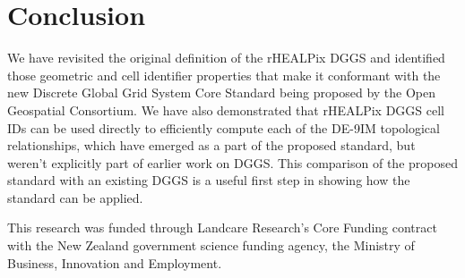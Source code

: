 \documentclass[12pt]{iopart}
\begin{document}
\section{Conclusion}
We have revisited the original definition of the rHEALPix DGGS and identified those geometric and cell identifier properties that make it conformant with the  new Discrete Global Grid System Core Standard being proposed by the Open Geospatial Consortium. We have also demonstrated that rHEALPix DGGS cell IDs can be used directly to efficiently compute each of the DE-9IM topological relationships, which have emerged as a part of the proposed standard, but weren't explicitly part of earlier work on DGGS. This comparison of the proposed standard with an existing DGGS is a useful first step in showing how the standard can be applied.




\ack
This research was funded through Landcare Research's Core Funding contract with the New Zealand government science funding agency, the Ministry of Business, Innovation and Employment. 
\end{document}
